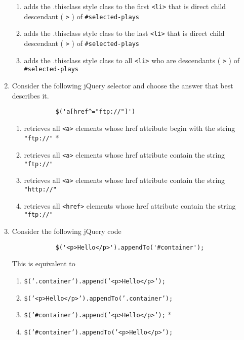 \begin{enumerate}
\begin{enumerate}
            \item adds the .thisclass style class to the first \texttt{<li>} that is direct child descendant ( \texttt{>} ) of \texttt{\#selected-plays}
            \item adds the .thisclass style class to the last \texttt{<li>} that is direct child descendant ( \texttt{>} ) of \texttt{\#selected-plays}
            \item adds the .thisclass style class to all \texttt{<li>} who are descendants ( \texttt{>} ) of \texttt{\#selected-plays}
        \end{enumerate}
    \item Consider the following jQuery selector and choose the answer that best describes it.
        \begin{verbatim}
            $('a[href^="ftp://"]')
        \end{verbatim}
        \begin{enumerate}
            \item retrieves all \texttt{<a>} elements whose href attribute begin with the string \texttt{"ftp://"} *
            \item retrieves all \texttt{<a>} elements whose href attribute contain the string \texttt{"ftp://"}
            \item retrieves all \texttt{<a>} elements whose href attribute contain the string \texttt{"http://"}
            \item retrieves all \texttt{<href>} elements whose href attribute contain the string \texttt{"ftp://"}
        \end{enumerate}
    \item Consider the following jQuery code 
        \begin{verbatim}
            $('<p>Hello</p>').appendTo('#container');
        \end{verbatim}
        This is equivalent to
        \begin{enumerate}
            \item \texttt{\$('.container').append('<p>Hello</p>');}
            \item \texttt{\$('<p>Hello</p>').appendTo('.container');}
            \item \texttt{\$('\#container').append('<p>Hello</p>');} *
            
            \item \texttt{\$('\#container').appendTo('<p>Hello</p>');}
        \end{enumerate}
    

\end{enumerate}
